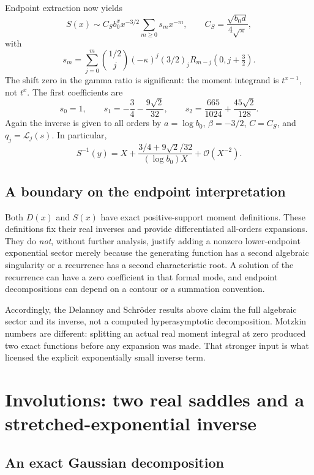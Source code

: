 \documentclass[11pt,a4paper]{article}
\numberwithin{equation}{section}
\theoremstyle{definition}
\theoremstyle{remark}
\newcommand{\cL}{\mathcal L}
\newcommand{\bigO}{\mathcal O}
\newcommand{\rising}[2]{(#1)_{#2}}
\begin{document}
Endpoint extraction now yields
\begin{equation}
 S(x)\sim C_S b_0^xx^{-3/2}\sum_{m\ge0}s_mx^{-m},
 \qquad C_S=\frac{\sqrt{b_0d}}{4\sqrt\pi},
 \label{eq:schroder-asymp}
\end{equation}
with
\begin{equation}
 s_m=\sum_{j=0}^m\binom{1/2}{j}(-\kappa)^j
                  \rising{3/2}{j}R_{m-j}(0,j+\tfrac32).
 \label{eq:schroder-coeff}
\end{equation}
The shift zero in the gamma ratio is significant: the moment integrand is $t^{x-1}$, not $t^x$. The first coefficients are
\[
 s_0=1,\qquad s_1=-\frac34-\frac{9\sqrt2}{32},\qquad
 s_2=\frac{665}{1024}+\frac{45\sqrt2}{128}.
\]
Again the inverse is given to all orders by $a=\log b_0$, $\beta=-3/2$, $C=C_S$, and $q_j=\cL_j(s)$. In particular,
\[
 S^{-1}(y)=X+\frac{3/4+9\sqrt2/32}{(\log b_0)X}+\bigO(X^{-2}).
\]

\subsection{A boundary on the endpoint interpretation}

Both $D(x)$ and $S(x)$ have exact positive-support moment definitions. These definitions fix their real inverses and provide differentiated all-orders expansions. They do \emph{not}, without further analysis, justify adding a nonzero lower-endpoint exponential sector merely because the generating function has a second algebraic singularity or a recurrence has a second characteristic root. A solution of the recurrence can have a zero coefficient in that formal mode, and endpoint decompositions can depend on a contour or a summation convention.

Accordingly, the Delannoy and Schr\"oder results above claim the full algebraic sector and its inverse, not a computed hyperasymptotic decomposition. Motzkin numbers are different: splitting an actual real moment integral at zero produced two exact functions before any expansion was made. That stronger input is what licensed the explicit exponentially small inverse term.

\section{Involutions: two real saddles and a stretched-exponential inverse}
\label{sec:involutions}

\subsection{An exact Gaussian decomposition}
\end{document}

